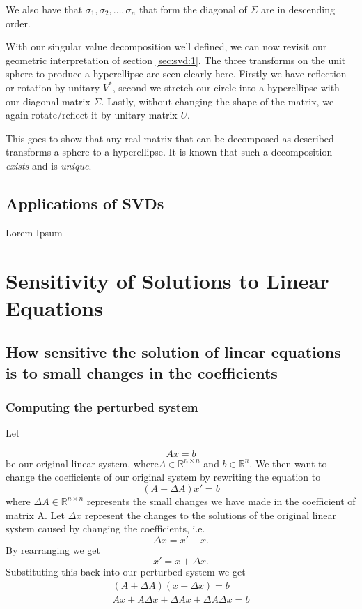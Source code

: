 \documentclass[12pt,reqno,twoside,titlepage]{article}
\theoremstyle{definition}
\theoremstyle{theorem}
\begin{document}
We also have that $\sigma_1, \sigma_2, \dots, \sigma_n$ that form the diagonal of $\Sigma$ are in descending order.

With our singular value decomposition well defined, we can now revisit our geometric interpretation of section \ref{sec:svd:1}. The three transforms on the unit sphere to produce a hyperellipse are seen clearly here. Firstly we have reflection or rotation by unitary $V^*$, second we stretch our circle into a hyperellipse with our diagonal matrix $\Sigma$. Lastly, without changing the shape of the matrix, we again rotate/reflect it by unitary matrix $U$.

This goes to show that any real matrix that can be decomposed as described transforms a sphere to a hyperellipse. It is known that such a decomposition \emph{exists} and is \emph{unique}. \cite{trefethen97}

\subsection{Applications of SVDs}
\label{sec:svd:3}

Lorem Ipsum

\section{Sensitivity of Solutions to Linear Equations}
\label{sec:ssl}
\subsection{How sensitive the solution of linear equations is to small changes in the coefficients }
\subsubsection{Computing the perturbed system}
Let

$$Ax=b$$
be our original linear system, where$A\in\mathbb{R}^{n\times n}$ and $b\in\mathbb{R}^n$.
\newline
We then want to change the coefficients of our original system by rewriting the equation to
$$(A+\Delta A)x'=b$$
where $\Delta A\in \mathbb{R}^{n\times n}$ represents the small changes we have made in the coefficient of matrix A.
\newline
Let $\Delta x$ represent the changes to the solutions of the original linear system caused by changing the coefficients, i.e. 
$$\Delta x=x'-x.$$
\newline 
By rearranging we get
$$x'=x+\Delta x.$$
Substituting this back into our perturbed system we get
\begin{align*}
(A+\Delta A)(x+\Delta x)= b\\
Ax+A\Delta x+\Delta A x+\Delta A\Delta x=b
\end{align*}
\end{document}
